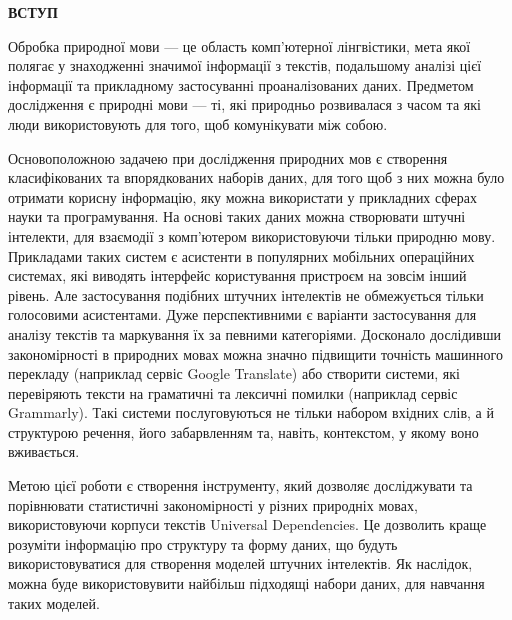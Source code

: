 \thispagestyle{empty}

\begin{center}
\textbf{\Large ВСТУП}
\end{center}

Обробка природної мови --- це область комп’ютерної лінгвістики, мета якої
полягає у знаходженні значимої інформації з текстів, подальшому аналізі цієї
інформації та прикладному застосуванні проаналізованих даних. Предметом
дослідження є природні мови --- ті, які природньо розвивалася з часом та які люди використовують для того, щоб комунікувати між собою.

Основоположною задачею при дослідження природних мов є створення класифікованих
та впорядкованих наборів даних, для того щоб з них можна було отримати
корисну інформацію, яку можна використати у прикладних сферах науки та програмування.
На основі таких даних можна створювати штучні інтелекти, для взаємодії з комп'ютером
використовуючи тільки природню мову. Прикладами таких систем є асистенти в популярних
мобільних операційних системах, які виводять інтерфейс користування пристроєм
на зовсім інший рівень. Але застосування подібних штучних інтелектів
не обмежується тільки голосовими асистентами. Дуже перспективними є варіанти застосування
для аналізу текстів та маркування їх за певними категоріями. Досконало дослідивши
закономірності в природних мовах можна значно підвищити точність машинного перекладу
(наприклад сервіс Google Translate) або створити системи, які перевіряють
тексти на граматичні та лексичні помилки (наприклад сервіс Grammarly). Такі системи
послуговуються не тільки набором вхідних слів, а й структурою речення,
його забарвленням та, навіть, контекстом, у якому воно вживається.

Метою цієї роботи є створення інструменту, який дозволяє досліджувати та порівнювати
статистичні закономірності у різних природніх мовах,
використовуючи корпуси текстів Universal Dependencies. Це дозволить краще розуміти
інформацію про структуру та форму даних, що будуть використовуватися для
створення моделей штучних інтелектів. Як наслідок, можна буде використовувити
найбільш підходящі набори даних, для навчання таких моделей.